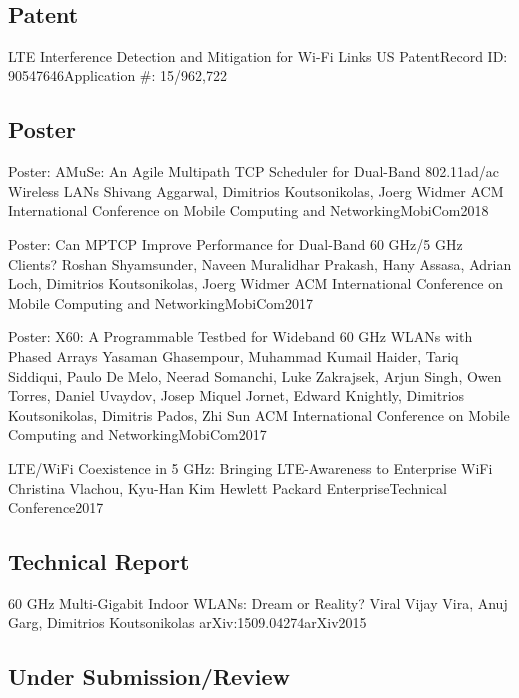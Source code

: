 ~\newline
~\newline
\subsection{Patent}
{LTE Interference Detection and Mitigation for Wi-Fi Links}
{US Patent}{Record ID: 90547646}{Application \#: 15/962,722}{}

\subsection{Poster}
{Poster: AMuSe: An Agile Multipath TCP Scheduler for Dual-Band 802.11ad/ac Wireless LANs}
{Shivang Aggarwal, Dimitrios Koutsonikolas, Joerg Widmer}
{ACM International Conference on Mobile Computing and Networking}{MobiCom}{2018}

{Poster: Can MPTCP Improve Performance for Dual-Band 60 GHz/5 GHz Clients?}
{Roshan Shyamsunder, Naveen Muralidhar Prakash, Hany Assasa, Adrian Loch, Dimitrios Koutsonikolas, Joerg Widmer}
{ACM International Conference on Mobile Computing and Networking}{MobiCom}{2017}

{Poster: X60: A Programmable Testbed for Wideband 60 GHz WLANs with Phased Arrays}
{Yasaman Ghasempour, Muhammad Kumail Haider, Tariq Siddiqui, Paulo De Melo, Neerad Somanchi, Luke Zakrajsek, Arjun Singh, Owen Torres, Daniel Uvaydov, Josep Miquel Jornet, Edward Knightly, Dimitrios Koutsonikolas, Dimitris Pados, Zhi Sun}
{ACM International Conference on Mobile Computing and Networking}{MobiCom}{2017}

{LTE/WiFi Coexistence in 5 GHz: Bringing LTE-Awareness to Enterprise WiFi}
{Christina Vlachou, Kyu-Han Kim}
{Hewlett Packard Enterprise}{Technical Conference}{2017}

\subsection{Technical Report}
{60 GHz Multi-Gigabit Indoor WLANs: Dream or Reality?}
{Viral Vijay Vira, Anuj Garg, Dimitrios Koutsonikolas}
{arXiv:1509.04274}{arXiv}{2015}

\subsection{Under Submission/Review}
